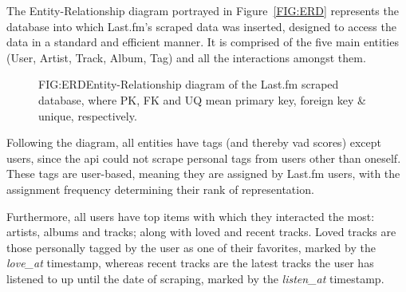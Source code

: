 The Entity-Relationship diagram portrayed in Figure~\ref{FIG:ERD} represents the database into which Last.fm's scraped data was inserted, designed to access the data in a standard and efficient manner. It is comprised of the five main entities (User, Artist, Track, Album, Tag) and all the interactions amongst them.

\begin{figure}[Entity-Relationship diagram]{FIG:ERD}{Entity-Relationship diagram of the Last.fm scraped database, where PK, FK and UQ mean primary key, foreign key \& unique, respectively.}
\end{figure}

Following the diagram, all entities have tags (and thereby \acs{vad} scores) except users, since the \acs{api} could not scrape personal tags from users other than oneself. These tags are user-based, meaning they are assigned by Last.fm users, with the assignment frequency determining their rank of representation.

Furthermore, all users have top items with which they interacted the most: artists, albums and tracks; along with loved and recent tracks. Loved tracks are those personally tagged by the user as one of their favorites, marked by the \emph{love\_at} timestamp, whereas recent tracks are the latest tracks the user has listened to up until the date of scraping, marked by the \emph{listen\_at} timestamp.